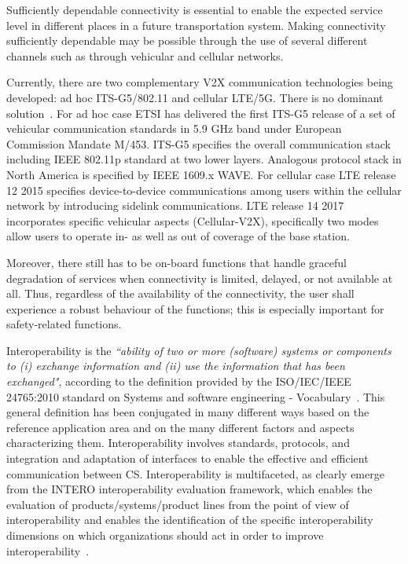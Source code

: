 Sufficiently dependable connectivity is essential to enable the expected service level in different places in a future transportation system. Making connectivity sufficiently dependable may be possible through the use of several different channels such as through vehicular and cellular networks. 

Currently, there are two complementary V2X communication technologies being developed: ad hoc ITS-G5/802.11 and cellular LTE/5G. There is no dominant solution~\cite{Elisabeth}. For ad hoc case ETSI has delivered the first ITS-G5 release of a set of vehicular communication standards in 5.9 GHz band under European Commission Mandate M/453. ITS-G5 specifies the overall communication stack including IEEE 802.11p standard at two lower layers. Analogous protocol stack in North America is specified by IEEE 1609.x WAVE. For cellular case LTE release 12 2015 specifies device-to-device communications among users within the cellular network by introducing sidelink communications. LTE release 14 2017 incorporates specific vehicular aspects (Cellular-V2X), specifically two modes allow users to operate in- as well as out of coverage of the base station.

Moreover, there still has to be on-board functions that handle graceful degradation of services when connectivity is limited, delayed, or not available at all. Thus, regardless of the availability of the connectivity, the user shall experience a robust behaviour of the functions; this is especially important for safety-related functions. 

Interoperability is the \textit{``ability of two or more (software) systems or components to (i) exchange information and (ii) use the information that has been exchanged"}, according to the definition provided by the ISO/IEC/IEEE 24765:2010 standard on Systems and software engineering - Vocabulary~\cite{STANDARD}. 
This general definition has been conjugated in many different ways based on the reference application area and on the many different factors and aspects characterizing them. Interoperability involves standards, protocols, and integration and adaptation of interfaces to enable the effective and efficient communication between CS. Interoperability is  multifaceted, as clearly emerge from the INTERO interoperability evaluation framework, which enables the evaluation of products/systems/product lines from the point of view of interoperability and enables the identification of the specific
interoperability dimensions on which organizations should act in order to improve interoperability~\cite{intero}.

